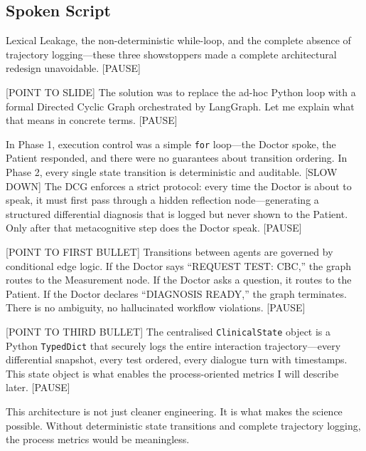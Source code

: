 \documentclass[12pt]{article}
\begin{document}
  \subsection*{Spoken Script}
  \begin{spokenbox}
   Lexical Leakage, the non-deterministic while-loop, and the complete absence of trajectory logging---these three showstoppers made a complete architectural redesign unavoidable. [PAUSE]

  [POINT TO SLIDE] The solution was to replace the ad-hoc Python loop with a formal Directed Cyclic Graph orchestrated by LangGraph. Let me explain what that means in concrete terms. [PAUSE]

  In Phase 1, execution control was a simple \texttt{for} loop---the Doctor spoke, the Patient responded, and there were no guarantees about transition ordering. In Phase 2, every single state transition is deterministic and auditable. [SLOW DOWN] The DCG enforces a strict protocol: every time the Doctor is about to speak, it must first pass through a hidden reflection node---generating a structured differential diagnosis that is logged but never shown to the Patient. Only after that metacognitive step does the Doctor speak. [PAUSE]

  [POINT TO FIRST BULLET] Transitions between agents are governed by conditional edge logic. If the Doctor says ``REQUEST TEST: CBC,'' the graph routes to the Measurement node. If the Doctor asks a question, it routes to the Patient. If the Doctor declares ``DIAGNOSIS READY,'' the graph terminates. There is no ambiguity, no hallucinated workflow violations. [PAUSE]

  [POINT TO THIRD BULLET] The centralised \texttt{ClinicalState} object is a Python \texttt{TypedDict} that securely logs the entire interaction trajectory---every differential snapshot, every test ordered, every dialogue turn with timestamps. This state object is what enables the process-oriented metrics I will describe later. [PAUSE]

  This architecture is not just cleaner engineering. It is what makes the science possible. Without deterministic state transitions and complete trajectory logging, the process metrics would be meaningless.
  \end{spokenbox}
\end{document}
